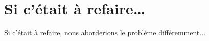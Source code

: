\section{Si c'était à refaire…}

Si c'était à refaire, nous aborderions le problème différemment...
